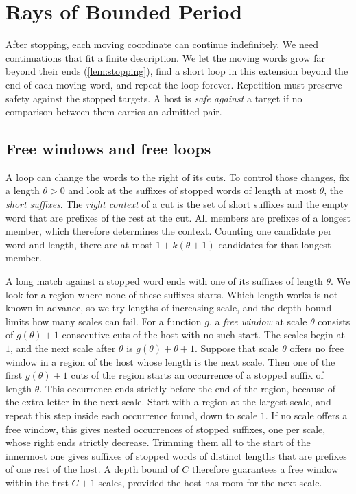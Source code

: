 \section{Rays of Bounded Period}
\label{sec:rays}

After stopping, each moving coordinate can continue indefinitely. We need
continuations that fit a finite description. We let the moving words grow
far beyond their ends (\cref{lem:stopping}), find a short loop in this
extension beyond the end of each moving word, and repeat the loop forever.
Repetition must preserve safety against the stopped targets. A host is
\emph{safe against} a target if no comparison between them carries an
admitted pair.

\subsection{Free windows and free loops}

A loop can change the words to the right of its cuts. To control those
changes, fix a length $\theta>0$ and look at the suffixes of stopped words
of length at most $\theta$, the \emph{short suffixes}. The \emph{right
context} of a cut is the set of short suffixes and the empty word that are
prefixes of the rest at the cut. All members are prefixes of a longest
member, which therefore determines the context. Counting one candidate per
word and length, there are at most $1+k(\theta+1)$ candidates for that
longest member.

A long match against a stopped word ends with one of its suffixes of
length $\theta$. We look for a region where none of these suffixes starts.
Which length works is not known in advance, so we try lengths of
increasing scale, and the depth bound limits how many scales can fail.
For a function $g$, a \emph{free window} at scale $\theta$ consists of
$g(\theta)+1$ consecutive cuts of the host with no such start. The scales
begin at $1$, and the next scale after $\theta$ is $g(\theta)+\theta+1$.
Suppose that scale $\theta$ offers no free window in a region of the host
whose length is the next scale. Then one of the first $g(\theta)+1$ cuts
of the region starts an occurrence of a stopped suffix of length $\theta$.
This occurrence ends strictly before the end of the region, because of the
extra letter in the next scale. Start with a region at the largest scale,
and repeat this step inside each occurrence found, down to scale $1$. If no
scale offers a free window, this gives nested occurrences of stopped
suffixes, one per scale, whose right ends strictly decrease. Trimming them
all to the start of the innermost one gives suffixes of stopped words of
distinct lengths that are prefixes of one rest of the host. A depth bound
of $C$ therefore guarantees a free window within the first $C+1$ scales,
provided the host has room for the next scale.

